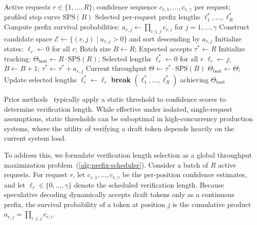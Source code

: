 \begin{algorithm}[t]
\caption{Hardware-Aware Prefix Scheduler}    
\label{alg:prefix-scheduler}    
\begin{algorithmic}[1]    
\REQUIRE Active requests $r \in \{1,\dots,R\}$; confidence sequence $c_{r,1},\dots,c_{r,\gamma}$ per request; profiled step curve $\text{SPS}(B)$    
\ENSURE Selected per-request prefix lengths $\ell^*_1,\dots,\ell^*_R$    
  \STATE Compute prefix survival probabilities: $a_{r,j} \gets \prod_{i \leq j} c_{r,i}$ for $j = 1,\dots,\gamma$    
\ENDFOR    
\STATE Construct candidate space $\mathcal{E} \gets \{(r, j) \mid a_{r,j} > 0\}$ and sort descending by $a_{r,j}$    
\STATE Initialize states: $\ell_r \gets 0$ for all $r$; Batch size $B \gets R$; Expected accepts $\tau^* \gets R$    
\STATE Initialize tracking: $\Theta_{\text{best}} \gets R \cdot \text{SPS}(R)$; Selected lengths $\ell^*_r \gets 0$ for all $r$    
  \STATE $\ell_r \gets j$; $B \gets B + 1$; $\tau^* \gets \tau^* + a_{r,j}$    
  \STATE Current throughput $\Theta \gets \tau^* \cdot \text{SPS}(B)$    
    \STATE $\Theta_{\text{best}} \gets \Theta$; Update selected lengths $\ell^*_r \gets \ell_r$
  \ELSE
    \STATE \textbf{break}
  \ENDIF    
\ENDFOR    
\RETURN $(\ell^*_1,\dots,\ell^*_R)$ achieving $\Theta_{\text{best}}$    
\end{algorithmic}    
\end{algorithm}

Prior methods~\citep{huang2024specdec++,li-etal-2024-eagle} typically apply a static threshold to confidence scores to determine verification length. While effective under isolated, single-request assumptions, static thresholds can be suboptimal in high-concurrency production systems, where the utility of verifying a draft token depends heavily on the current system load.  
  
To address this, we formulate verification length selection as a global throughput maximization problem~(\autoref{alg:prefix-scheduler}). Consider a batch of $R$ active requests. For request $r$, let $c_{r,1},\dots,c_{r,\gamma}$ be the per-position confidence estimates, and let $\ell_r \in \{0,\dots,\gamma\}$ denote the scheduled verification length. Because speculative decoding dynamically accepts draft tokens only as a continuous prefix, the survival probability of a token at position $j$ is the cumulative product $a_{r,j} = \prod_{i \leq j} c_{r,i}$.  
  
